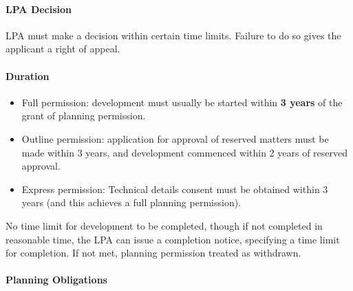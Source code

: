 \documentclass[
]{article}
\providecommand{\tightlist}{%
  \setlength{\itemsep}{0pt}\setlength{\parskip}{0pt}}
\begin{document}
\hypertarget{lpa-decision}{%
\paragraph{LPA Decision}\label{lpa-decision}}

LPA must make a decision within certain time limits. Failure to do so
gives the applicant a right of appeal.

\hypertarget{duration}{%
\paragraph{Duration}\label{duration}}

\begin{itemize}
\tightlist
\item
  Full permission: development must usually be started within \textbf{3
  years} of the grant of planning permission.
\item
  Outline permission: application for approval of reserved matters must
  be made within 3 years, and development commenced within 2 years of
  reserved approval.
\item
  Express permission: Technical details consent must be obtained within
  3 years (and this achieves a full planning permission).
\end{itemize}

No time limit for development to be completed, though if not completed
in reasonable time, the LPA can issue a completion notice, specifying a
time limit for completion. If not met, planning permission treated as
withdrawn.

\hypertarget{planning-obligations}{%
\paragraph{Planning Obligations}\label{planning-obligations}}
\end{document}
